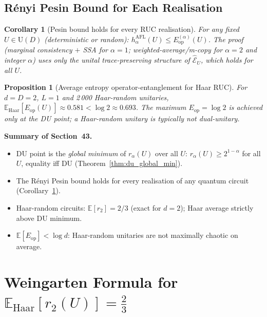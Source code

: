 \documentclass[12pt,a4paper]{article}
\newtheorem{proposition}[theorem]{Proposition}
\newtheorem{corollary}[theorem]{Corollary}
\begin{document}
\subsection{Rényi Pesin Bound for Each Realisation}
\label{sec:ruc_pesin}

\begin{corollary}[Pesin bound holds for every RUC realisation]
\label{cor:ruc_pesin}
For any fixed $U\in\mathrm{U}(D)$ (deterministic or random):
$h_\alpha^{\mathrm{AFL}}(U)\leq E_{\mathrm{op}}^{(\alpha)}(U)$.
The proof (marginal consistency $+$ SSA for $\alpha=1$;
weighted-average/m-copy for $\alpha=2$ and integer $\alpha$) uses only
the unital trace-preserving structure of $\hat{\mathcal{E}}_U$,
which holds for all $U$.
\end{corollary}

\begin{proposition}[Average entropy operator-entanglement for Haar RUC]
\label{prop:haar_eop}
For $d=D=2$, $L=1$ and 2\,000 Haar-random unitaries,
$\mathbb{E}_{\mathrm{Haar}}[E_{\mathrm{op}}(U)] \approx 0.581 < \log 2 \approx 0.693$.
The maximum $E_{\mathrm{op}}=\log 2$ is achieved only at the DU point;
a Haar-random unitary is typically not dual-unitary.
\end{proposition}

\bigskip
\noindent\textbf{Summary of Section~43.}
\begin{itemize}
\item DU point is the \emph{global minimum} of $r_\alpha(U)$ over all $U$:
  $r_\alpha(U)\geq 2^{1-\alpha}$ for all $U$, equality iff DU
  (Theorem~\ref{thm:du_global_min}).
\item The Rényi Pesin bound holds for every realisation of any quantum circuit
  (Corollary~\ref{cor:ruc_pesin}).
\item Haar-random circuits: $\mathbb{E}[r_2]=2/3$ (exact for $d=2$);
  Haar average strictly above DU minimum.
\item $\mathbb{E}[E_{\mathrm{op}}]<\log d$: Haar-random unitaries are not
  maximally chaotic on average.
\end{itemize}

\section{Weingarten Formula for $\mathbb{E}_{\mathrm{Haar}}[r_2(U)]=\frac{2}{3}$}
\label{sec:weingarten}
\end{document}
